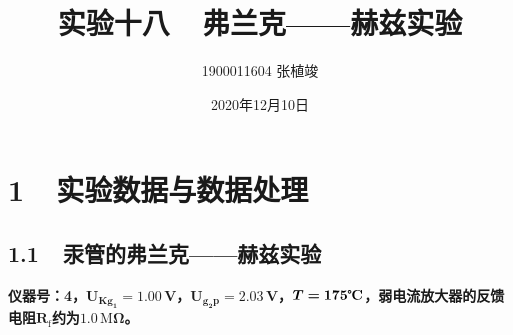 \documentclass[a4paper,fontset=windows]{ctexart}
\begin{document}
\Large

    \title{\huge\textbf{实验十八\ \ 弗兰克——赫兹实验}}
    \author{\LARGE 1900011604 张植竣}
    \date{\LARGE 2020年12月10日}

    \maketitle

    \section*{1\ \  实验数据与数据处理}
    \bigskip

    \subsection*{1.1\ \ 汞管的弗兰克——赫兹实验}

    \textbf{仪器号：4，$\boldsymbol{U_{\mathbf{Kg_{1}}} = 1.00\,\mathbf{V}}$，$\boldsymbol{U_{\mathbf{g_{2}p}} = 2.03\,\mathbf{V}}$，$\boldsymbol{T = 175\text{\textbf{\textcelsius}}}$，弱电流放大器的反馈电阻$\boldsymbol{R_{\mathrm{f}}}$约为$\boldsymbol{1.0\,\mathrm{M}\Omega}$。}
\end{document}

